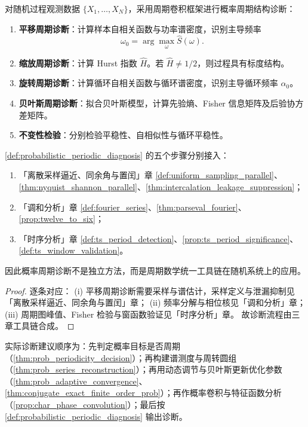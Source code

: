 \begin{definition}[概率周期诊断流程]\label{def:probabilistic_periodic_diagnosis}
对随机过程观测数据 $\{X_1,\dots,X_N\}$，采用周期卷积框架进行概率周期结构诊断：
\begin{enumerate}[label=(\roman*)]
    \item \textbf{平移周期诊断}：计算样本自相关函数与功率谱密度，识别主导频率
    \[
    \omega_0=\arg\max_\omega \hat S(\omega).
    \]
    \item \textbf{缩放周期诊断}：计算 Hurst 指数 $\hat H$。若 $\hat H\neq1/2$，则过程具有标度结构。
    \item \textbf{旋转周期诊断}：计算循环自相关函数与循环谱密度，识别主导循环频率 $\alpha_0$。
    \item \textbf{贝叶斯周期诊断}：拟合贝叶斯模型，计算先验熵、Fisher 信息矩阵及后验协方差矩阵。
    \item \textbf{不变性检验}：分别检验平稳性、自相似性与循环平稳性。
\end{enumerate}
\end{definition}

\begin{theorem}[概率周期诊断流程与三章接口]\label{thm:prob_diagnosis_integration}
\cref{def:probabilistic_periodic_diagnosis} 的五个步骤分别接入：
\begin{enumerate}[label=(\roman*)]
    \item 「离散采样逼近、同余角与置闰」章 \cref{def:uniform_sampling_parallel}、\cref{thm:nyquist_shannon_parallel}、\cref{thm:intercalation_leakage_suppression}；
    \item 「调和分析」章 \cref{def:fourier_series}、\cref{thm:parseval_fourier}、\cref{prop:twelve_to_six}；
    \item 「时序分析」章 \cref{def:ts_period_detection}、\cref{prop:ts_period_significance}、\cref{def:ts_window_validation}。
\end{enumerate}
因此概率周期诊断不是独立方法，而是周期数学统一工具链在随机系统上的应用。
\end{theorem}

\begin{proof}
逐条对应：
(i) 平移周期诊断需要采样与谱估计，采样定义与泄漏抑制见「离散采样逼近、同余角与置闰」章；
(ii) 频率分解与相位核见「调和分析」章；
(iii) 周期图峰值、Fisher 检验与窗函数验证见「时序分析」章。
故诊断流程由三章工具链合成。
\end{proof}

\begin{remark}[整合后的操作顺序]\label{rem:prob_integration_order}
实际诊断建议顺序为：先判定概率目标是否周期（\cref{thm:prob_periodicity_decision}）；再构建谱测度与周转圆组（\cref{thm:prob_series_reconstruction}）；再用动态调节与贝叶斯更新优化参数（\cref{thm:prob_adaptive_convergence}、\cref{thm:conjugate_exact_finite_order_prob}）；再作概率卷积与特征函数分析（\cref{prop:char_phase_convolution}）；最后按 \cref{def:probabilistic_periodic_diagnosis} 输出诊断。
\end{remark}

